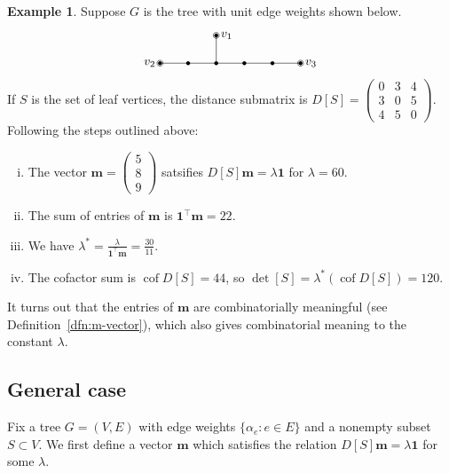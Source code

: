 \documentclass{amsart}
\theoremstyle{definition}
\newtheorem{eg}[thm]{Example}
\newcommand{\bone}{\mathbf{1}}
\newcommand{\boldm}{\mathbf{m}}
\newcommand{\tr}{\intercal}
\DeclareMathOperator{\cof}{cof}
\begin{document}
\begin{eg}
Suppose $G$ is the tree with unit edge weights shown below.
\[
\begin{tikzpicture}[scale=0.8]
	\coordinate (1) at (0,0);
	\coordinate (A) at (1,0);
	\coordinate (B) at (2,0);
	\coordinate (C) at (3,0);
	\coordinate (D) at (4,0);
	\coordinate (2) at (5,0);
	\coordinate (3) at (2,1);
	
	\foreach \c in {1,2,3,A,B,C,D} {
		\fill (\c) circle (2pt);
	}
	\foreach \c in {1,2,3} {
		\draw (\c) circle (3pt);
	}

	\draw (1) -- (A);
	\draw (A) -- (B);
	\draw (B) -- (3);
	\draw (B) -- (C);
	\draw (C) -- (D);
	\draw (D) -- (2);
	
	\foreach \c/\d/\label in {1/left/v_2,2/right/v_3,3/right/v_1} {
		\node[\d=0.2] at (\c) {$\label$};
	}
\end{tikzpicture}
\]
If $S$ is the set of leaf vertices, the distance submatrix is 
$
D[S] = \begin{pmatrix}
0 & 3 & 4 \\
3 & 0 & 5 \\
4 & 5 & 0
\end{pmatrix}.
$
Following the steps outlined above:
\begin{enumerate}[(i)]
\item 
The vector $\boldm = \begin{pmatrix} 5 \\ 8 \\ 9 \end{pmatrix}$
satsifies $D[S] \boldm = \lambda \bone$ for $\lambda = 60$.

\item 
The sum of entries of $\boldm$ is $\bone^\tr \boldm = 22$.

\item 
We have $\displaystyle \lambda^* = \frac{\lambda}{\bone^\tr \boldm} = \frac{30}{11}$.

\item 
The cofactor sum is $\cof D[S] = 44$, so $\det[S] = \lambda^*(\cof D[S]) = 120$.
\end{enumerate}
\end{eg}
It turns out that the entries of $\boldm$ are combinatorially meaningful (see Definition~\ref{dfn:m-vector}),
which also gives combinatorial meaning to
the constant $\lambda$.

\subsection{General case}
Fix a tree $G = (V,E)$ with edge weights $\{\alpha_e : e \in E\}$ and a nonempty subset $S \subset V$.
We first define a vector $\boldm$ which satisfies the relation $D[S] \boldm = \lambda \bone$ for some $\lambda$.
\end{document}
